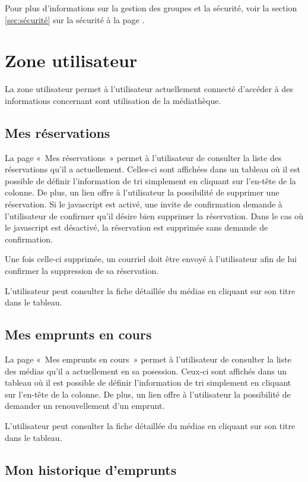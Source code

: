 \documentclass[letter, 11pt]{report}
\begin{document}
Pour plus d'informations sur la gestion des groupes et la sécurité, voir la section \ref{sec:sécurité} sur la sécurité à la page \pageref{sec:sécurité}.

\section{Zone utilisateur}
La zone utilisateur permet à l'utilisateur actuellement connecté d'accéder à des informations concernant sont utilisation de la médiathèque.

\subsection{Mes réservations}
La page «~Mes réservations~» permet à l'utilisateur de consulter la liste des réservations qu'il a actuellement. Celles-ci sont affichées dans un tableau où il est possible de définir l'information de tri simplement en cliquant sur l'en-tête de la colonne. De plus, un lien offre à l'utilisateur la possibilité de supprimer une réservation. Si le javascript est activé, une invite de confirmation demande à l'utilisateur de confirmer qu'il désire bien supprimer la réservation. Dans le cas où le javascript est désactivé, la réservation est supprimée sans demande de confirmation.

Une fois celle-ci supprimée, un courriel doit être envoyé à l'utilisateur afin de lui confirmer la suppression de sa réservation.

L'utilisateur peut consulter la fiche détaillée du médias en cliquant sur son titre dans le tableau.

\subsection{Mes emprunts en cours}
La page «~Mes emprunts en cours~» permet à l'utilisateur de consulter la liste des médias qu'il a actuellement en sa posession. Ceux-ci sont affichés dans un tableau où il est possible de définir l'information de tri simplement en cliquant sur l'en-tête de la colonne. De plus, un lien offre à l'utilisateur la possibilité de demander un renouvellement d'un emprunt.

L'utilisateur peut consulter la fiche détaillée du médias en cliquant sur son titre dans le tableau.

\subsection{Mon historique d'emprunts}
\end{document}
